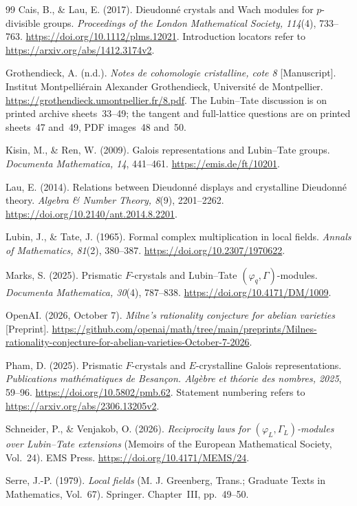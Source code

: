 \documentclass[11pt]{article}
\theoremstyle{definition}\newtheorem{definition}[theorem]{Definition}
\theoremstyle{remark}\newtheorem{remark}[theorem]{Remark}
\begin{document}
\begin{thebibliography}{99}
Cais, B., \& Lau, E. (2017). Dieudonn\'e crystals and Wach modules for $p$-divisible groups. \emph{Proceedings of the London Mathematical Society, 114}(4), 733--763. \url{https://doi.org/10.1112/plms.12021}. Introduction locators refer to \url{https://arxiv.org/abs/1412.3174v2}.

Grothendieck, A. (n.d.). \emph{Notes de cohomologie cristalline, cote 8} [Manuscript]. Institut Montpelli\'erain Alexander Grothendieck, Universit\'e de Montpellier. \url{https://grothendieck.umontpellier.fr/8.pdf}. The Lubin--Tate discussion is on printed archive sheets~33--49; the tangent and full-lattice questions are on printed sheets~47 and~49, PDF images~48 and~50.

Kisin, M., \& Ren, W. (2009). Galois representations and Lubin--Tate groups. \emph{Documenta Mathematica, 14}, 441--461. \url{https://emis.de/ft/10201}.

Lau, E. (2014). Relations between Dieudonn\'e displays and crystalline Dieudonn\'e theory. \emph{Algebra \& Number Theory, 8}(9), 2201--2262. \url{https://doi.org/10.2140/ant.2014.8.2201}.

Lubin, J., \& Tate, J. (1965). Formal complex multiplication in local fields. \emph{Annals of Mathematics, 81}(2), 380--387. \url{https://doi.org/10.2307/1970622}.

Marks, S. (2025). Prismatic $F$-crystals and Lubin--Tate $(\varphi_q,\Gamma)$-modules. \emph{Documenta Mathematica, 30}(4), 787--838. \url{https://doi.org/10.4171/DM/1009}.

OpenAI. (2026, October 7). \emph{Milne's rationality conjecture for abelian varieties} [Preprint]. \url{https://github.com/openai/math/tree/main/preprints/Milnes-rationality-conjecture-for-abelian-varieties-October-7-2026}.

Pham, D. (2025). Prismatic $F$-crystals and $E$-crystalline Galois representations. \emph{Publications math\'ematiques de Besan\c{c}on. Alg\`ebre et th\'eorie des nombres, 2025}, 59--96. \url{https://doi.org/10.5802/pmb.62}. Statement numbering refers to \url{https://arxiv.org/abs/2306.13205v2}.

Schneider, P., \& Venjakob, O. (2026). \emph{Reciprocity laws for $(\varphi_L,\Gamma_L)$-modules over Lubin--Tate extensions} (Memoirs of the European Mathematical Society, Vol.~24). EMS Press. \url{https://doi.org/10.4171/MEMS/24}.

Serre, J.-P. (1979). \emph{Local fields} (M. J. Greenberg, Trans.; Graduate Texts in Mathematics, Vol.~67). Springer. Chapter~III, pp.~49--50.
\end{thebibliography}
\end{document}

